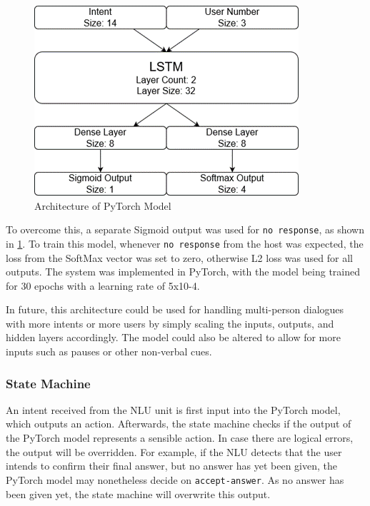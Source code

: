 \documentclass[hidelinks, 11pt]{article}
\begin{document}
\begin{figure}
  \includegraphics[width=\columnwidth]{images/DM_LSTM.png}
  \caption{Architecture of PyTorch Model}
  \label{fig:model_architecture}
\end{figure}

To overcome this, a separate Sigmoid output was used for \verb|no response|, as shown in \cref{fig:model_architecture}. To train this model, whenever \verb|no response| from the host was expected, the loss from the SoftMax vector was set to zero, otherwise L2 loss was used for all outputs. The system was implemented in PyTorch, with the model being trained for 30 epochs with a learning rate of 5x10-4.

In future, this architecture could be used for handling multi-person dialogues with more intents or more users by simply scaling the inputs, outputs, and hidden layers accordingly. The model could also be altered to allow for more inputs such as pauses or other non-verbal cues.

\subsubsection{State Machine}
\label{subsec:dm}

An intent received from the NLU unit is first input into the PyTorch model, which outputs an action. Afterwards, the state machine checks if the output of the PyTorch model represents a sensible action. In case there are logical errors, the output will be overridden. For example, if the NLU detects that the user intends to confirm their final answer, but no answer has yet been given, the PyTorch model may nonetheless decide on \verb|accept-answer|. As no answer has been given yet, the state machine will overwrite this output.
\end{document}
